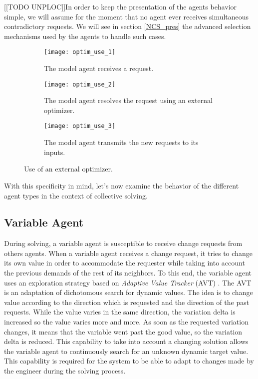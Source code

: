[[TODO UNPLOC]]In order to keep the presentation of the agents behavior simple, we will assume for the moment that no agent ever receives simultaneous contradictory requests. We will see in section \ref{NCS_pres} the advanced selection mechanisms used by the agents to handle such cases.

\begin{figure}
	\centering
	\begin{subfigure}[b]{0.32\textwidth}
		\centering
		\texttt{[image: optim\_use\_1]}
		\caption{The model agent receives a request.}\label{optim_use:1}
	\end{subfigure}
	\hfill
	\begin{subfigure}[b]{0.32\textwidth}
		\centering
		\texttt{[image: optim\_use\_2]}
		\caption{The model agent resolves the request using an external optimizer.}\label{optim_use:2}
	\end{subfigure}
	\hfill
	\begin{subfigure}[b]{0.32\textwidth}
		\centering
		\texttt{[image: optim\_use\_3]}
		\caption{The model agent transmits the new requests to its inputs.}\label{optim_use:3}
	\end{subfigure}
	\caption{Use of an external optimizer.}\label{optim_use}
\end{figure}

With this specificity in mind, let's now examine the behavior of the different agent types in the context of collective solving.

\subsection{Variable Agent}\label{variable_agent_solving}

During solving, a variable agent is susceptible to receive change requests from others agents. When a variable agent receives a change request, it tries to change its own value in order to accommodate the requester while taking into account the previous demands of the rest of its neighbors. To this end, the variable agent uses an exploration strategy based on \emph{Adaptive Value Tracker} (AVT) \cite{Lemouzy_2011}. The AVT is an adaptation of dichotomous search for dynamic values. The idea is to change value according to the direction which is requested and the direction of the past requests. While the value varies in the same direction, the variation delta is increased so the value varies more and more. As soon as the requested variation changes, it means that the variable went past the good value, so the variation delta is reduced.
This capability to take into account a changing solution allows the variable agent to continuously search for an unknown dynamic target value. This capability is required for the system to be able to adapt to changes made by the engineer during the solving process.


